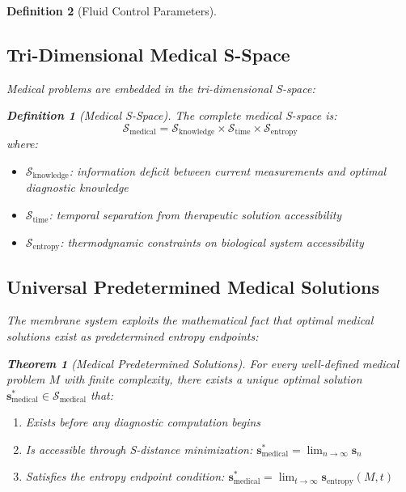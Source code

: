 \documentclass[12pt,a4paper]{article}
\newtheorem{theorem}{Theorem}
\newtheorem{definition}{Definition}
\begin{document}
\begin{definition}[Fluid Control Parameters]
\subsection{Tri-Dimensional Medical S-Space}

Medical problems are embedded in the tri-dimensional S-space:

\begin{definition}[Medical S-Space]
The complete medical S-space is:
\begin{equation}
\mathcal{S}_{\text{medical}} = \mathcal{S}_{\text{knowledge}} \times \mathcal{S}_{\text{time}} \times \mathcal{S}_{\text{entropy}}
\end{equation}
where:
\begin{itemize}
\item $\mathcal{S}_{\text{knowledge}}$: information deficit between current measurements and optimal diagnostic knowledge
\item $\mathcal{S}_{\text{time}}$: temporal separation from therapeutic solution accessibility
\item $\mathcal{S}_{\text{entropy}}$: thermodynamic constraints on biological system accessibility
\end{itemize}
\end{definition}

\subsection{Universal Predetermined Medical Solutions}

The membrane system exploits the mathematical fact that optimal medical solutions exist as predetermined entropy endpoints:

\begin{theorem}[Medical Predetermined Solutions]
For every well-defined medical problem $M$ with finite complexity, there exists a unique optimal solution $\mathbf{s}_{\text{medical}}^* \in \mathcal{S}_{\text{medical}}$ that:
\begin{enumerate}
\item Exists before any diagnostic computation begins
\item Is accessible through S-distance minimization: $\mathbf{s}_{\text{medical}}^* = \lim_{n \to \infty} \mathbf{s}_n$
\item Satisfies the entropy endpoint condition: $\mathbf{s}_{\text{medical}}^* = \lim_{t \to \infty} \mathbf{s}_{\text{entropy}}(M, t)$
\end{enumerate}
\end{theorem}


\end{definition}
\end{document}
